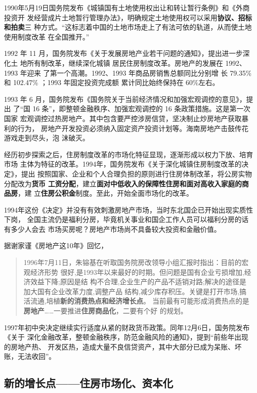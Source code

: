 1990年5月19日国务院发布《城镇国有土地使用权出让和转让暂行条例》和《外商投资开
发经营成片土地暂行管理办法》，明确规定土地使用权可以采用\textbf{协议、招标和拍卖}三
种方式。“这标志着中国的土地市场走上了有法可依的轨道，从而使土地使用制度改革
在全国推开。”


1992 年 11 月，国务院发布《关于发展房地产业若干问题的通知》，提出进一步深化土
地所有制改革，继续深化城镇 居民住房制度改革。房地产的发展在 1992、1993 年迎来
了第一个高潮。1992、1993 年商品房销售总额同比分别增
长 79.35\% 和 102.47\% ；1993 年固定投资完成额 累计同比始终保持在 60\%左右。

1993 年 6 月，国务院发布《国务院关于当前经济情况和加强宏观调控的意见》，提出
了“国 16 条”，即整顿金融秩序、加强宏观调控的 16 条政策措施。这是第一次国家
宏观调控过热房地产。其中包含要严控涉房信贷，坚决制止炒房地产获取暴利的行为，
房地产开发投资必须纳入固定资产投资计划等。海南房地产击鼓传花游戏走到尽头，泡
沫破灭。

经历初步探索之后，住房制度改革的市场化特征显现，逐渐形成以权力下放、培育市场
主体为特征的改革。1994年，国务院发布《关于深化城镇住房制度改革的决定》，提出
按照国家、企业和个人合理负担的原则进行住房体制改革，将公房实物分配改为\textbf{货币
  工资分配}，建立\textbf{面对中低收入的保障性住房和面对高收入家庭的商品房}，建
立\textbf{住房公积金}制度。至此，开始全面市场化的改革。\cite{CJZK201802012}

1994年这份《决定》并没有有效刺激房地产市场，当时东北国企已开始出现实质性下岗，
全国主流仍是福利分房，毕竟机关事业和国企工作人员可以福利分房的话有多少人会去
市场买房呢？房地产市场尚不具备较大投资和金融价值。

据谢家谨《房地产这10年》回忆，
\begin{quotation}
  1996年7月11日，朱镕基在听取国务院房改领导小组汇报时指出：目前的宏观经济形势
  很好,是1993年以来最好的时期。但问题是国有企业亏损增加,经济效益下降;原因是结
  构不合理,企业生产的产品不适销对路;解决的途径是加大国有企业改革力度,调整产品
  结构,减少库存积压。关键是打开市场,搞活流通,培植\textbf{新的消费热点和经济增长点}。
  当前最有可能形成消费热点的是\textbf{房地产}……一要推进\textbf{住房商品化}，二要有个好
  的规划。
\end{quotation}

1997年初中央决定继续实行适度从紧的财政货币政策。同年12月6日，国务院发布《关于
深化金融改革，整顿金融秩序，防范金融风险的通知》，提到“前些年出现的房地产热、
开发区热，造成大量不良信贷资产，其中大部分已成为呆账、坏账，无法收回”。

\subsection{新的增长点——住房市场化、资本化}


